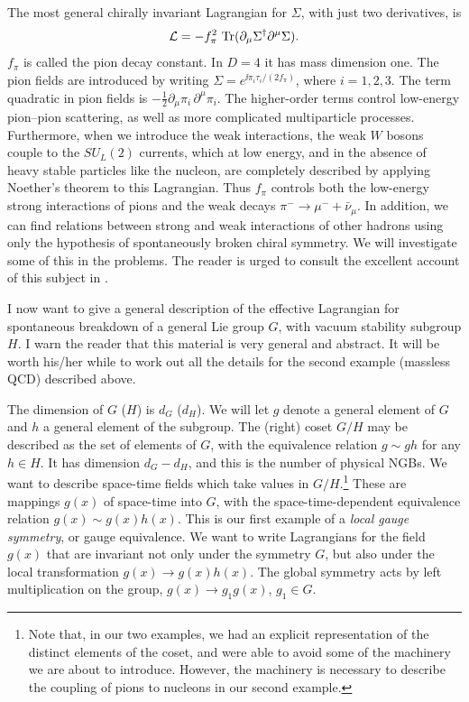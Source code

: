 The most general chirally invariant Lagrangian for $\Sigma$, with just two
derivatives, is
\begin{equation}
  \mathcal L=-f_\pi^2\,\operatorname{Tr}(\partial_\mu\Sigma^\dagger\partial^\mu\Sigma).
  \label{eq:7.4}
\end{equation}
$f_\pi$ is called the pion decay constant. In $D=4$ it has mass dimension one.
The pion fields are introduced by
writing $\Sigma=e^{\ii\pi_i\tau_i/(2f_\pi)}$, where $i=1,2,3$. The term
quadratic in pion fields is $-\frac12\partial_\mu\pi_i\,\partial^\mu\pi_i$. The higher-order
terms control low-energy pion--pion scattering, as well as more complicated
multiparticle processes. Furthermore, when we introduce the weak interactions,
the weak $W$ bosons couple to the $SU_L(2)$ currents, which at low energy, and
in the absence of heavy stable particles like the nucleon, are completely
described by applying Noether's theorem to this Lagrangian. Thus $f_\pi$ controls
both the low-energy strong interactions of pions and the weak decays
$\pi^-\to\mu^-+\bar\nu_\mu$. In addition, we can find relations between strong
and weak interactions of other hadrons using only the hypothesis of
spontaneously broken chiral symmetry. We will investigate some of this in the
problems. The reader is urged to consult the excellent account of this subject
in \cite{banks-ref-42}.


I now want to give a general description of the effective Lagrangian for
spontaneous breakdown of a general Lie group $G$, with vacuum stability subgroup
$H$. I warn the reader that this material is very general and abstract. It will
be worth his/her while to work out all the details for the second example
(massless QCD) described above.

The dimension of $G$ ($H$) is $d_G$ ($d_H$). We will let $g$ denote a general
element of $G$ and $h$ a general element of the subgroup. The (right) coset
$G/H$ may be described as the set of elements of $G$, with the equivalence
relation $g\sim gh$ for any $h\in H$. It has dimension $d_G-d_H$, and this is
the number of physical NGBs. We want to describe space-time fields which take
values in $G/H$.\footnote[7]{Note that, in our two examples, we had an explicit
representation of the distinct elements of the coset, and were able to avoid
some of the machinery we are about to introduce. However, the machinery is
necessary to describe the coupling of pions to nucleons in our second example.}
These are mappings $g(x)$ of space-time into $G$, with the space-time-dependent
equivalence relation $g(x)\sim g(x)h(x)$. This is our first example of a
\emph{local gauge symmetry}, or gauge equivalence. We want to write Lagrangians
for the field $g(x)$ that are invariant not only under the symmetry $G$, but
also under the local transformation $g(x)\to g(x)h(x)$. The global symmetry
acts by left multiplication on the group, $g(x)\to g_1g(x)$, $g_1\in G$.

